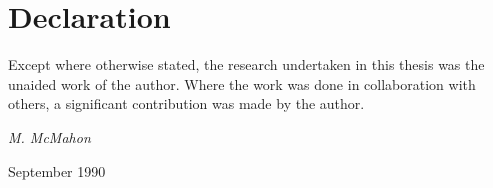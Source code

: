 \chapter*{Declaration}

\normalsize
Except where otherwise stated, the research undertaken in this thesis
was the unaided work of the author. Where the work was done in collaboration
with others, a significant contribution was made by the author.


\vspace{20mm}
\hfill {\it M. McMahon}

\hfill September 1990


